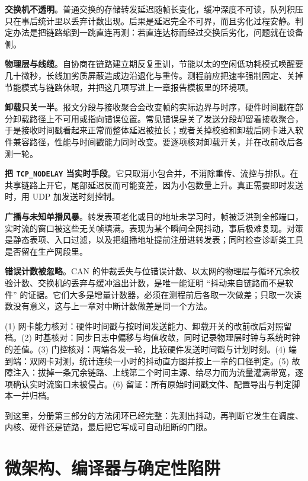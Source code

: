 \documentclass[12pt,a4paper,fontset=fandol]{ctexbook}
\newcommand{\Tp}[1]{\texttt{#1}}
\begin{document}
\textbf{交换机不透明}。普通交换的存储转发延迟随帧长变化，缓冲深度不可读，队列积压只在事后统计里以丢弃计数出现。后果是延迟完全不可界，而且劣化过程安静。判定办法是把链路缩到一跳直连再测：若直连达标而经过交换后劣化，问题就在设备侧。

\textbf{物理层与线缆}。自协商在链路建立期反复重训，节能以太的空闲低功耗模式唤醒要几十微秒，长线加劣质屏蔽造成边沿退化与重传。测程前应把速率强制固定、关掉节能模式与链路休眠，并把这几项写进上一章报告模板里的环境项。

\textbf{卸载只关一半}。报文分段与接收聚合会改变帧的实际边界与时序，硬件时间戳在部分卸载路径上不可用或指向错误位置。常见错误是关了发送分段却留着接收聚合，于是接收时间戳看起来正常而整体延迟被拉长；或者关掉校验和卸载后网卡进入软件兼容路径，性能与时间戳能力同时改变。要逐项核对卸载开关，并在改前改后各测一轮。

\textbf{把 \Tp{TCP\_NODELAY} 当实时手段}。它只取消小包合并，不消除重传、流控与排队。在共享链路上开它，尾部延迟反而可能变差，因为小包数量上升。真正需要即时发送时，用 UDP 加发送时刻控制。

\textbf{广播与未知单播风暴}。转发表项老化或目的地址未学习时，帧被泛洪到全部端口，实时流的窗口被这些无关帧填满。表现为某个瞬间全网抖动，事后极难复现。对策是静态表项、入口过滤，以及把组播地址提前注册进转发表；同时检查诊断类工具是否留在生产网段里。

\textbf{错误计数被忽略}。CAN 的仲裁丢失与位错误计数、以太网的物理层与循环冗余校验计数、交换机的丢弃与缓冲溢出计数，是唯一能证明 ``抖动来自链路而不是软件'' 的证据。它们大多是增量计数器，必须在测程前后各取一次做差；只取一次读数没有意义，这与上一章对中断计数做差是同一个方法。

\begin{bestpractice}[title={现场验证最小清单}]
(1) 网卡能力核对：硬件时间戳与按时间发送能力、卸载开关的改前改后对照留档。(2) 时基核对：同步日志中偏移与均值收敛，同时记录物理层时钟与系统时钟的差值。(3) 门控核对：两端各发一轮，比较硬件发送时间戳与计划时刻。(4) 端到端：双网卡对测，统计连续一小时的抖动直方图并按上一章的口径判定。(5) 故障注入：拔掉一条冗余链路、上线第二个时间主源、给尽力而为流量灌满带宽，逐项确认实时流窗口未被侵占。(6) 留证：所有原始时间戳文件、配置导出与判定脚本一并归档。
\end{bestpractice}

到这里，分册第三部分的方法闭环已经完整：先测出抖动，再判断它发生在调度、内核、硬件还是链路，最后把它写成可自动阻断的门限。

\chapter{微架构、编译器与确定性陷阱}
\label{ch:ch13-determinism-pitfalls}
\end{document}
